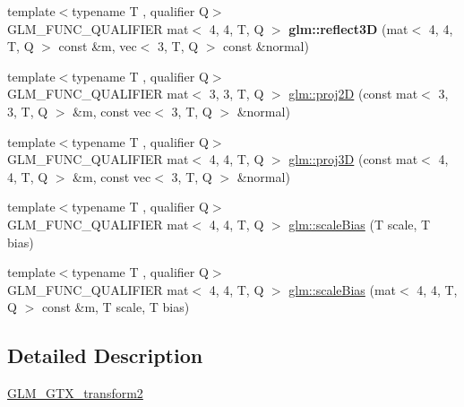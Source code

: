 \begin{DoxyCompactItemize}
{\footnotesize template$<$typename T , qualifier Q$>$ }\\G\+L\+M\+\_\+\+F\+U\+N\+C\+\_\+\+Q\+U\+A\+L\+I\+F\+I\+ER mat$<$ 4, 4, T, Q $>$ {\bfseries glm\+::reflect3D} (mat$<$ 4, 4, T, Q $>$ const \&m, vec$<$ 3, T, Q $>$ const \&normal)
\item 
{\footnotesize template$<$typename T , qualifier Q$>$ }\\G\+L\+M\+\_\+\+F\+U\+N\+C\+\_\+\+Q\+U\+A\+L\+I\+F\+I\+ER mat$<$ 3, 3, T, Q $>$ \hyperlink{group__gtx__transform2_ga5b992a0cdc8298054edb68e228f0d93e}{glm\+::proj2D} (const mat$<$ 3, 3, T, Q $>$ \&m, const vec$<$ 3, T, Q $>$ \&normal)
\item 
{\footnotesize template$<$typename T , qualifier Q$>$ }\\G\+L\+M\+\_\+\+F\+U\+N\+C\+\_\+\+Q\+U\+A\+L\+I\+F\+I\+ER mat$<$ 4, 4, T, Q $>$ \hyperlink{group__gtx__transform2_gaa2b7f4f15b98f697caede11bef50509e}{glm\+::proj3D} (const mat$<$ 4, 4, T, Q $>$ \&m, const vec$<$ 3, T, Q $>$ \&normal)
\item 
{\footnotesize template$<$typename T , qualifier Q$>$ }\\G\+L\+M\+\_\+\+F\+U\+N\+C\+\_\+\+Q\+U\+A\+L\+I\+F\+I\+ER mat$<$ 4, 4, T, Q $>$ \hyperlink{group__gtx__transform2_gabf249498b236e62c983d90d30d63c99c}{glm\+::scale\+Bias} (T scale, T bias)
\item 
{\footnotesize template$<$typename T , qualifier Q$>$ }\\G\+L\+M\+\_\+\+F\+U\+N\+C\+\_\+\+Q\+U\+A\+L\+I\+F\+I\+ER mat$<$ 4, 4, T, Q $>$ \hyperlink{group__gtx__transform2_gae2bdd91a76759fecfbaef97e3020aa8e}{glm\+::scale\+Bias} (mat$<$ 4, 4, T, Q $>$ const \&m, T scale, T bias)
\end{DoxyCompactItemize}


\subsection{Detailed Description}
\hyperlink{group__gtx__transform2}{G\+L\+M\+\_\+\+G\+T\+X\+\_\+transform2} 